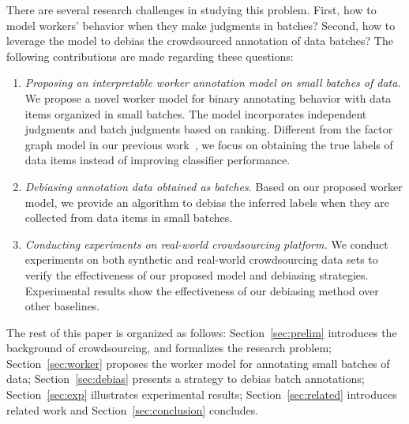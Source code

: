 There are several research challenges in studying this problem.  
First, how to model workers' behavior when they make judgments in batches?  
Second, how to leverage the model to debias the crowdsourced annotation of data batches?
The following contributions are made regarding these questions:
\begin{enumerate}
  \item \emph{Proposing an interpretable worker annotation model on small batches of data.}
        We propose a novel worker model for binary annotating behavior with data items organized in small batches.  
        The model incorporates independent judgments and batch judgments based on ranking.  
        Different from the factor graph model in our previous work~\cite{zhuang:wsdm2015}, 
        we focus on obtaining the true labels of data items instead of improving classifier performance.  
  \item \emph{Debiasing annotation data obtained as batches.}
        Based on our proposed worker model, we provide an algorithm to debias the inferred labels 
        when they are collected from data items in small batches.  
  \item \emph{Conducting experiments on real-world crowdsourcing platform.}  
        We conduct experiments on both synthetic and real-world crowdsourcing data sets 
        to verify the effectiveness of our proposed model and debiasing strategies.  
        Experimental results show the effectiveness of our debiasing method over other baselines.   
\end{enumerate}

The rest of this paper is organized as follows:
Section~\ref{sec:prelim} introduces the background of crowdsourcing, and formalizes the research problem;
Section~\ref{sec:worker} proposes the worker model for annotating small batches of data;
Section~\ref{sec:debias} presents a strategy to debias batch annotations;
Section~\ref{sec:exp} illustrates experimental results;
Section~\ref{sec:related} introduces related work and Section~\ref{sec:conclusion} concludes. 







